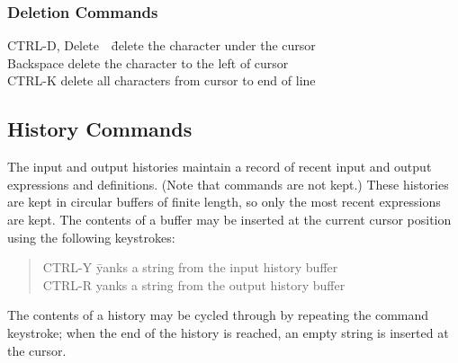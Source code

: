 \subsubsection{Deletion Commands}
\begin{tabbing}
CTRL-D, Delete\ \    \=delete the character under the cursor\\
Backspace \>delete the character to the left of cursor\\
CTRL-K \>delete all characters from cursor to end of line
\end{tabbing}

\subsection{History Commands}

	The input and output histories maintain a record of recent input
and output expressions and definitions.  (Note that commands are not kept.)
These histories
are kept in circular buffers of finite length, so only the most recent
expressions are kept.  The contents of a buffer may be inserted at the
current cursor position using the following keystrokes:
\begin{quote}
\begin{tabbing}
CTRL-Y    \=yanks a string from the input history buffer\\
CTRL-R \>yanks a string from the output history buffer
\end{tabbing}
\end{quote}
The contents of a history may be cycled through by repeating the
command keystroke;  when the end of the history is reached, an empty
string is inserted at the cursor.
